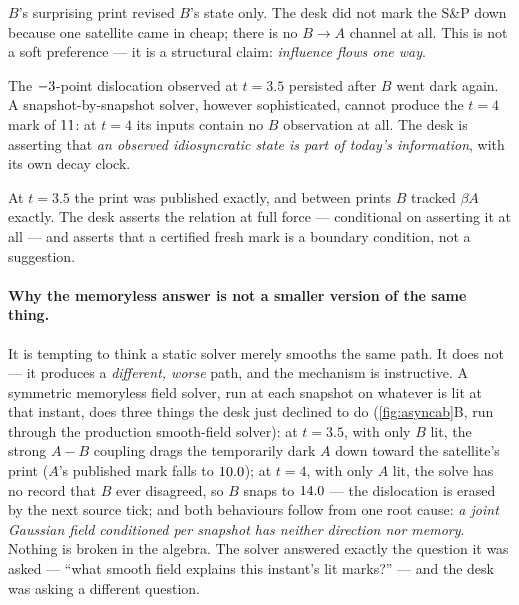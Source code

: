 \documentclass[11pt]{article}
\begin{document}
\begin{description}[leftmargin=1.7em,style=nextline]
\item[Direction.]  $B$'s surprising print revised $B$'s state only.  The
desk did not mark the S\&P down because one satellite came in cheap; there
is no $B\to A$ channel at all.  This is not a soft preference --- it is a
structural claim: \emph{influence flows one way}.
\item[Memory.]  The $-3$-point dislocation observed at
$t=3.5$ persisted after $B$ went dark again.  A snapshot-by-snapshot
solver, however sophisticated, cannot produce the $t=4$ mark of
$11$: at $t=4$ its inputs contain no $B$ observation at all.  The
desk is asserting that \emph{an observed idiosyncratic state is part of
today's information}, with its own decay clock.
\item[Rigidity.]  At $t=3.5$ the print was published exactly, and between
prints $B$ tracked $\beta A$ exactly.  The desk asserts the relation at
full force --- conditional on asserting it at all --- and asserts that a
certified fresh mark is a boundary condition, not a suggestion.
\end{description}

\paragraph{Why the memoryless answer is not a smaller version of the same
thing.}  It is tempting to think a static solver merely smooths the same
path.  It does not --- it produces a \emph{different, worse} path, and the
mechanism is instructive.  A symmetric memoryless field solver, run at each
snapshot on whatever is lit at that instant, does three things the desk
just declined to do (\cref{fig:asyncab}B, run through the production
smooth-field solver): at $t=3.5$, with only $B$ lit, the strong $A\!-\!B$
coupling drags the temporarily dark $A$ down toward the satellite's print
($A$'s published mark falls to $10.0$); at $t=4$, with only $A$
lit, the solve has no record that $B$ ever disagreed, so $B$ snaps to
$14.0$ --- the dislocation is erased by the next source tick; and
both behaviours follow from one root cause: \emph{a joint Gaussian field
conditioned per snapshot has neither direction nor memory}.  Nothing is
broken in the algebra.  The solver answered exactly the question it was
asked --- ``what smooth field explains this instant's lit marks?'' --- and
the desk was asking a different question.
\end{document}
